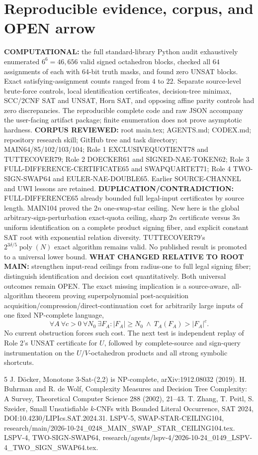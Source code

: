 \documentclass[11pt]{article}
\begin{document}
\section{Reproducible evidence, corpus, and OPEN arrow}
\textbf{COMPUTATIONAL:} the full standard-library Python audit exhaustively enumerated $6^6=46{,}656$ valid signed octahedron blocks, checked all $64$ assignments of each with 64-bit truth masks, and found zero UNSAT blocks. Exact satisfying-assignment counts ranged from $4$ to $22$. Separate source-level brute-force controls, local identification certificates, decision-tree minimax, SCC/2CNF SAT and UNSAT, Horn SAT, and opposing affine parity controls had zero discrepancies. The reproducible complete code and raw JSON accompany the user-facing artifact package; finite enumeration does not prove asymptotic hardness.
\textbf{CORPUS REVIEWED:} root main.tex; AGENTS.md; CODEX.md; repository research skill; GitHub tree and task directory; MAIN64/85/102/103/104; Role 1 EXCLUSIVEQUOTIENT78 and TUTTECOVER79; Role 2 DOECKER61 and SIGNED-NAE-TOKEN62; Role 3 FULL-DIFFERENCE-CERTIFICATE65 and SWAPQUARTET71; Role 4 TWO-SIGN-SWAP64 and EULER-NAE-DOUBLE65. Earlier SOURCE-CHANNEL and UWI lessons are retained.
\textbf{DUPLICATION/CONTRADICTION:} FULL-DIFFERENCE65 already bounded full legal-input certificates by source length. MAIN104 proved the $2n$ one-swap-star ceiling. New here is the global arbitrary-sign-perturbation exact-quota ceiling, sharp $2n$ certificate versus $3n$ uniform identification on a complete product signing fiber, and explicit constant SAT root with exponential relation diversity. TUTTECOVER79's $2^{3\delta/5}\operatorname{poly}(N)$ exact algorithm remains valid. No published result is promoted to a universal lower bound.
\textbf{WHAT CHANGED RELATIVE TO ROOT MAIN:} strengthen input-read ceilings from radius-one to full legal signing fiber; distinguish identification and decision cost quantitatively. Both universal outcomes remain OPEN.
The exact missing implication is a source-aware, all-algorithm theorem proving superpolynomial post-acquisition acquisition/compression/direct-continuation cost for arbitrarily large inputs of one fixed NP-complete language,
\[
\forall A\ \forall c>0\ \forall N_0\ \exists F_A:
|F_A|\ge N_0\ \wedge\ T_A(F_A)>|F_A|^c .
\]
No current obstruction forces such cost. The next test is independent replay of Role 2's UNSAT certificate for $U$, followed by complete-source and sign-query instrumentation on the $U/V$-octahedron products and all strong symbolic shortcuts.
\begin{thebibliography}{5}
 J. D\"ocker, Monotone 3-Sat-(2,2) is NP-complete, arXiv:1912.08032 (2019).
 H. Buhrman and R. de Wolf, Complexity Measures and Decision Tree Complexity: A Survey, Theoretical Computer Science 288 (2002), 21--43.
 T. Zhang, T. Peitl, S. Szeider, Small Unsatisfiable $k$-CNFs with Bounded Literal Occurrence, SAT 2024, DOI:10.4230/LIPIcs.SAT.2024.31.
 LSPV-5, SWAP-STAR-CEILING104, research/main/2026-10-24\_0248\_MAIN\_SWAP\_STAR\_CEILING104.tex.
 LSPV-4, TWO-SIGN-SWAP64, research/agents/lspv-4/2026-10-24\_0149\_LSPV-4\_TWO\_SIGN\_SWAP64.tex.
\end{thebibliography}
\end{document}
